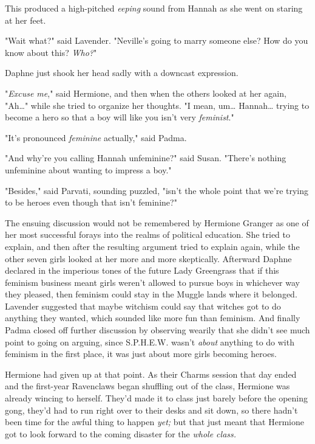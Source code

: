 This produced a high-pitched \emph{eeping} sound from Hannah as she went on 
staring at her feet.

"Wait what?" said Lavender. "Neville's going to marry someone else? How do you 
know about this? \emph{Who?}"

Daphne just shook her head sadly with a downcast expression.

"\emph{Excuse me}," said Hermione, and then when the others looked at her 
again, "Ah{\ldots}" while she tried to organize her thoughts. "I mean, 
um{\ldots} Hannah{\ldots} trying to become a hero so that a boy will like you 
isn't very \emph{feminist}."

"It's pronounced \emph{feminine} actually," said Padma.

"And why're you calling Hannah unfeminine?" said Susan. "There's nothing 
unfeminine about wanting to impress a boy."

"Besides," said Parvati, sounding puzzled, "isn't the whole point that we're 
trying to be heroes even though that isn't feminine?"

The ensuing discussion would not be remembered by Hermione Granger as one of 
her most successful forays into the realms of political education. She tried to 
explain, and then after the resulting argument tried to explain again, while 
the other seven girls looked at her more and more skeptically. Afterward Daphne 
declared in the imperious tones of the future Lady Greengrass that if this 
feminism business meant girls weren't allowed to pursue boys in whichever way 
they pleased, then feminism could stay in the Muggle lands where it belonged. 
Lavender suggested that maybe witchism could say that witches got to do 
anything they wanted, which sounded like more fun than feminism. And finally 
Padma closed off further discussion by observing wearily that she didn't see 
much point to going on arguing, since S.P.H.E.W. wasn't\emph{ about} anything 
to do with feminism in the first place, it was just about more girls becoming 
heroes.

Hermione had given up at that point.
\sbreak
As their Charms session that day ended and the first-year Ravenclaws began 
shuffling out of the class, Hermione was already wincing to herself. They'd 
made it to class just barely before the opening gong, they'd had to run right 
over to their desks and sit down, so there hadn't been time for the awful thing 
to happen \emph{yet;} but that just meant that Hermione got to look forward to 
the coming disaster for the \emph{whole class.}


